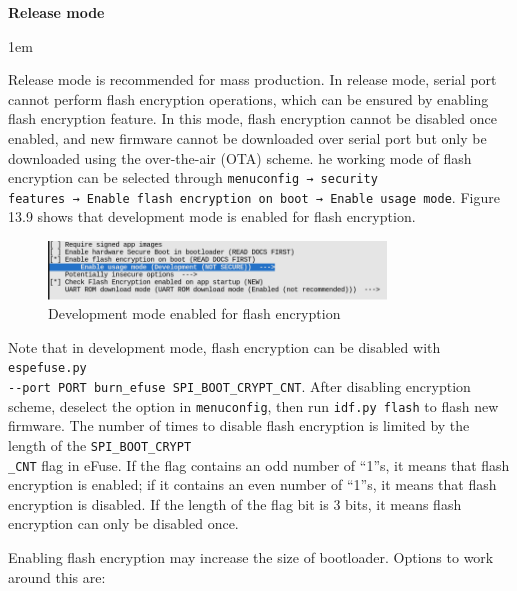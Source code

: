 \documentclass[a4paper,12pt,openany]{book}
\newenvironment{term}[1]{
    \textbf{#1}

    \leftskip 1em
    \parskip 0pt
}
\newcommand{\note}[2][NOTE]{ %
\vspace{6pt}
\begin{tabular}{b{\textwidth}}
\hline
\fontfamily{phv}\selectfont \textbf{#1}\\
\leftskip 1em #2\\
\hline
\end{tabular}
}
\begin{document}
\begin{term}{Release mode}
    Release mode is recommended for mass production. In release mode, serial port cannot perform flash encryption operations, which can be ensured by enabling flash encryption feature. In this mode, flash encryption cannot be disabled once enabled, and new firmware cannot be downloaded over serial port but only be downloaded using the over-the-air (OTA) scheme.
\end{term}

The working mode of flash encryption can be selected through \verb|menuconfig → security|\\ \verb|features → Enable flash encryption on boot → Enable usage mode|. Figure 13.9 shows that development mode is enabled for flash encryption.

\begin{figure}[!h]
    \centering
    \includegraphics[width=0.8\textwidth]{D13Z/13-9}
    \caption{Development mode enabled for flash encryption}
\end{figure}

Note that in development mode, flash encryption can be disabled with \verb|espefuse.py|\\ \verb|--port PORT burn_efuse SPI_BOOT_CRYPT_CNT|. After disabling encryption scheme, deselect the option in \verb|menuconfig|, then run \verb|idf.py flash| to flash new firmware. The number of times to disable flash encryption is limited by the length of the \verb|SPI_BOOT_CRYPT|\\ \verb|_CNT| flag in eFuse. If the flag contains an odd number of “1”s, it means that flash encryption is enabled; if it contains an even number of “1”s, it means that flash encryption is disabled. If the length of the flag bit is 3 bits, it means flash encryption can only be disabled once.


Enabling flash encryption may increase the size of bootloader. Options to work around this are: 
\end{document}

